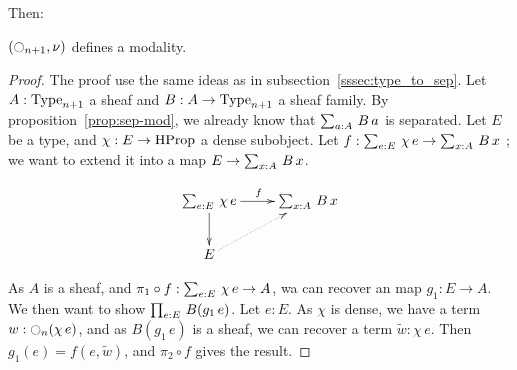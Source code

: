 Then:
\begin{prop}
  $(\ocircle_{n+1},\nu)$ defines a modality.
\end{prop}
\begin{proof}
  The proof use the same ideas as in
  subsection~\ref{sssec:type_to_sep}. Let $A:\operatorname{Type}_{n+1}$ a sheaf and
  $B:A\to\operatorname{Type}_{n+1}$ a sheaf family. By
  proposition~\ref{prop:sep-mod}, we already know that $\sum_{a:A}\, B\,
    a$ is separated. Let $E$ be a type, and $\chi:E\to \operatorname{HProp}$ a
  dense subobject. Let $f:\sum_{e:E}\, \chi\, e \to \sum_{x:A}\, B\, x$
  ; we want to extend it into a map $E\to \sum_{x:A}\, B\, x$.

  \[
    \xymatrix{
      \sumD e E {\chi\, e} \ar[r]^f \ar[d] & \sumD x A {B\, x} \\
      E \ar@{.>}[ru]&
    }
  \]

  As $A$ is a sheaf, and $\pi_1\circ f:\sum_{e:E}\, \chi\, e
  \to A$, wa can recover an map $g_1:E \to A$. We then want to show
  $\prod_{e:E}\, B(g_1\, e)$. Let $e:E$. As $\chi$ is dense, we have a
  term $w:\ocircle_n(\chi\, e)$, and as $B(g_1\, e)$ is a sheaf, we can
  recover a term $\widetilde w:\chi\, e$. Then $g_1(e) =
  f(e,\widetilde w)$, and $\pi_2\circ f$ gives the result.
\end{proof}

